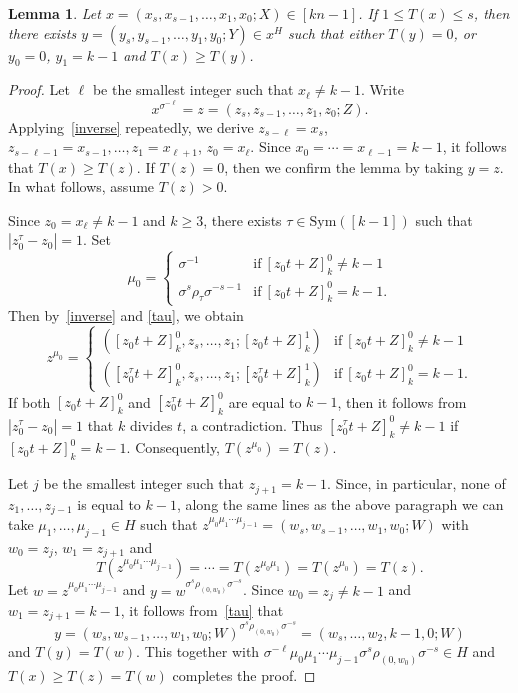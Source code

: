 \documentclass[11pt,a4paper,reqno]{amsart}
\newcommand{\Sym}{\mathrm{Sym}}
\newtheorem{lemma}[theorem]{Lemma}
\theoremstyle{definition}
\begin{document}
\begin{lemma}
\label{xy}
Let $x=(x_{s},x_{s-1},\ldots,x_1,x_0;X)\in [kn-1]$. If $1\leq T(x)\leq s$, then there exists $y=(y_{s},y_{s-1},\ldots,y_1,y_0;Y)\in x^{H}$ such that either $T(y)=0$, or $y_0=0$, $y_1=k-1$ and $T(x)\geq T(y)$.
\end{lemma}

\begin{proof}
Let $\ell$ be the smallest integer such that $x_\ell\ne k-1$. Write
\begin{equation*}
x^{\sigma^{-\ell}}=z=(z_{s},z_{s-1},\ldots,z_1,z_0;Z).
\end{equation*}
Applying~\eqref{inverse} repeatedly, we derive $z_{s-\ell}=x_s$, $z_{s-\ell-1}=x_{s-1},\ldots,z_{1}=x_{\ell+1}$, $z_0=x_{\ell}$. Since $x_0=\cdots=x_{\ell-1}=k-1$, it follows that $T(x)\geq T(z)$. If $T(z)=0$, then we confirm the lemma by taking $y=z$. In what follows, assume $T(z)>0$.

Since $z_0=x_{\ell}\ne k-1$ and $k\geq 3$,  there exists $\tau\in\Sym([k-1])$ such that $|z_0^{\tau}-z_0|=1$.
Set
\begin{equation*}
\mu_0=
  \begin{cases}
    \sigma^{-1} & \text{if}~[z_0t+Z]_{k}^{0}\ne k-1 \\
    \sigma^{s}\rho_{\tau}\sigma^{-s-1} & \text{if}~[z_0t+Z]_{k}^{0}=k-1.
  \end{cases}
\end{equation*}
Then by~\eqref{inverse} and \eqref{tau}, we obtain
\begin{equation*}
z^{\mu_0}=
  \begin{cases}
    \left([z_0t+Z]_k^0,z_s,\ldots,z_1;[z_0t+Z]_k^1\right) & \text{if}~[z_0t+Z]_{k}^{0}\ne k-1 \\
    \left([z_0^{\tau} t+Z]_k^0,z_s,\ldots,z_1;[z_0^{\tau}t+Z]_k^1\right) & \text{if}~[z_0t+Z]_{k}^{0}=k-1.
  \end{cases}
\end{equation*}
If both $[z_0t+Z]_{k}^{0}$ and $[z_0^{\tau}t+Z]_{k}^{0}$ are equal to $k-1$, then it follows from   $|z_0^{\tau}-z_0|=1$ that $k$ divides $t$, a contradiction. Thus $[z_0^{\tau}t+Z]_{k}^{0}\ne k-1$ if  $[z_0t+Z]_{k}^{0}= k-1$. Consequently, $T(z^{\mu_0})=T(z)$.

Let $j$ be the smallest integer such that $z_{j+1}=k-1$. Since, in particular, none of $z_1,\ldots,z_{j-1}$ is equal to $k-1$, along the same lines as the above paragraph we can take $\mu_1,\ldots,\mu_{j-1}\in H$ such that $z^{\mu_0\mu_1\cdots\mu_{j-1}}=(w_{s},w_{s-1},\ldots,w_1,w_0;W)$ with $w_0=z_j$, $w_1=z_{j+1}$ and
\begin{equation*}
T(z^{\mu_0\mu_1\cdots\mu_{j-1}})=\cdots=T(z^{\mu_0\mu_1})=T(z^{\mu_0})=T(z).
\end{equation*}
Let $w=z^{\mu_0\mu_1\cdots\mu_{j-1}}$ and $y=w^{\sigma^{s}\rho_{(0,w_0)}\sigma^{-s}}$. Since $w_0=z_j\neq k-1$ and $w_1=z_{j+1}=k-1$, it follows from~\eqref{tau} that
\[
y=(w_{s},w_{s-1},\ldots,w_1,w_0;W)^{\sigma^{s}\rho_{(0,w_0)}\sigma^{-s}}=(w_s,\ldots,w_2,k-1,0;W)
\]
and $T(y)=T(w)$. This together with $\sigma^{-\ell}\mu_0\mu_1\cdots\mu_{j-1}\sigma^{s}\rho_{(0,w_0)}\sigma^{-s}\in H$ and $T(x)\geq T(z)=T(w)$ completes the proof.
\end{proof}
\end{document}
